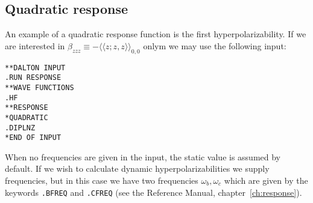 \subsection{Quadratic response}
\label{subsec:quadrsp}

\begin{center}
\end{center}

An example of a quadratic response function
is the first 
hyperpolarizability. If we are
interested in
$\beta_{zzz}\equiv-\langle\!\langle z;z,z\rangle\!\rangle_{0,0}$ 
onlym we may use the following input:
\begin{verbatim}
**DALTON INPUT
.RUN RESPONSE
**WAVE FUNCTIONS
.HF
**RESPONSE
*QUADRATIC
.DIPLNZ
*END OF INPUT
\end{verbatim}
When no frequencies are given in the input, the static value is assumed by
default. If we wish to calculate dynamic hyperpolarizabilities we supply
frequencies, but in this case we have two frequencies
$\omega_b, \omega_c$ which are given by the keywords \texttt{.BFREQ} and
{\tt .CFREQ} (see the Reference Manual, chapter~\ref{ch:response}).


